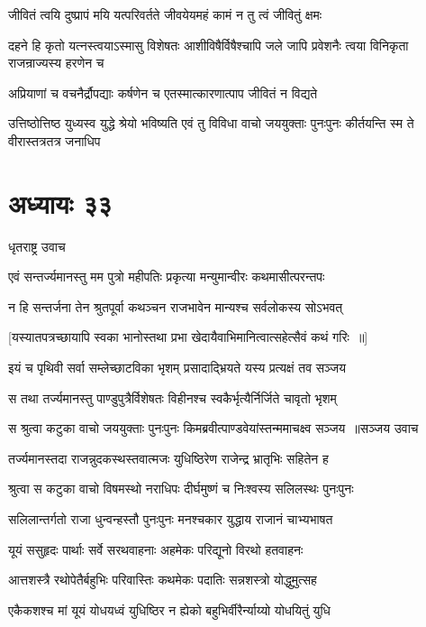 \twolineshloka
{जीवितं त्वयि दुष्प्रापं मयि यत्परिवर्तते}
{जीवयेयमहं कामं न तु त्वं जीवितुं क्षमः}


\threelineshloka
{दहने हि कृतो यत्नस्त्वयाऽस्मासु विशेषतः}
{आशीविषैर्विषैश्चापि जले जापि प्रवेशनैः}
{त्वया विनिकृता राजन्राज्यस्य हरणेन च}


\twolineshloka
{अप्रियाणां च वचनैर्द्रौपद्याः कर्षणेन च}
{एतस्मात्कारणात्पाप जीवितं न विद्यते}


उत्तिष्ठोत्तिष्ठ युध्यस्व युद्धे श्रेयो भविष्यति
\twolineshloka
{एवं तु विविधा वाचो जययुक्ताः पुनःपुनः}
{कीर्तयन्ति स्म ते वीरास्तत्रतत्र जनाधिप}


\chapter{अध्यायः ३३}
\twolineshloka
{धृतराष्ट्र उवाच}
{}


\twolineshloka
{एवं सन्तर्ज्यमानस्तु मम पुत्रो महीपतिः}
{प्रकृत्या मन्युमान्वीरः कथमासीत्परन्तपः}


\twolineshloka
{न हि सन्तर्जना तेन श्रुतपूर्वा कथञ्चन}
{राजभावेन मान्यश्च सर्वलोकस्य सोऽभवत्}


\twolineshloka
{[यस्यातपत्रच्छायापि स्वका भानोस्तथा प्रभा}
{खेदायैवाभिमानित्वात्सहेत्सैवं कथं गरिः ॥]}


\twolineshloka
{इयं च पृथिवी सर्वा सम्लेच्छाटविका भृशम्}
{प्रसादाद्भ्रियते यस्य प्रत्यक्षं तव सञ्जय}


\twolineshloka
{स तथा तर्ज्यमानस्तु पाण्डुपुत्रैर्विशेषतः}
{विहीनश्च स्वकैर्भृत्यैर्निर्जिते चावृतो भृशम्}


\threelineshloka
{स श्रुत्वा कटुका वाचो जययुक्ताः पुनःपुनः}
{किमब्रवीत्पाण्डवेयांस्तन्ममाचक्ष्व सञ्जय ॥सञ्जय उवाच}
{}


\twolineshloka
{तर्ज्यमानस्तदा राजन्नुदकस्थस्तवात्मजः}
{युधिष्ठिरेण राजेन्द्र भ्रातृभिः सहितेन ह}


\twolineshloka
{श्रुत्वा स कटुका वाचो विषमस्थो नराधिपः}
{दीर्घमुष्णं च निःश्वस्य सलिलस्थः पुनःपुनः}


\twolineshloka
{सलिलान्तर्गतो राजा धुन्वन्हस्तौ पुनःपुनः}
{मनश्चकार युद्धाय राजानं चाभ्यभाषत}


\twolineshloka
{यूयं ससुहृदः पार्थाः सर्वे सरथवाहनाः}
{अहमेकः परिद्यूनो विरथो हतवाहनः}


\twolineshloka
{आत्तशस्त्रै रथोपेतैर्बहुभिः परिवास्तिः}
{कथमेकः पदातिः सन्नशस्त्रो योद्धुमुत्सह}


\twolineshloka
{एकैकशश्च मां यूयं योधयध्वं युधिष्ठिर}
{न ह्येको बहुभिर्वीरैर्न्याय्यो योधयितुं युधि}


